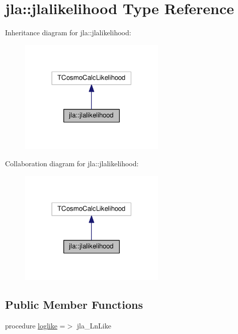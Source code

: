 \hypertarget{structjla_1_1jlalikelihood}{}\section{jla\+:\+:jlalikelihood Type Reference}
\label{structjla_1_1jlalikelihood}


Inheritance diagram for jla\+:\+:jlalikelihood\+:
\nopagebreak
\begin{figure}[H]
\begin{center}
\leavevmode
\includegraphics[width=198pt]{structjla_1_1jlalikelihood__inherit__graph}
\end{center}
\end{figure}


Collaboration diagram for jla\+:\+:jlalikelihood\+:
\nopagebreak
\begin{figure}[H]
\begin{center}
\leavevmode
\includegraphics[width=198pt]{structjla_1_1jlalikelihood__coll__graph}
\end{center}
\end{figure}
\subsection*{Public Member Functions}
\begin{DoxyCompactItemize}
\item 
procedure \mbox{\hyperlink{structjla_1_1jlalikelihood_a273fcb9a25e2c19605339ff00b974d9d}{loglike}} =$>$ jla\+\_\+\+Ln\+Like
\end{DoxyCompactItemize}


